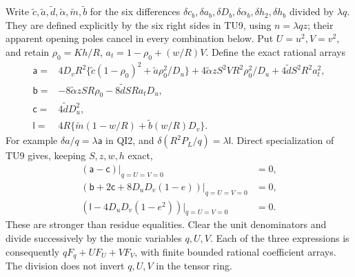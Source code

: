 Write $\widetilde c,\widetilde a,\widetilde d,\widetilde\alpha,
\widetilde m,\widetilde b$ for the six differences
$\delta c_b,\delta a_b,\delta D_b,\delta\alpha_b,
\delta h_2,\delta h_b$ divided by $\lambda q$.
They are defined explicitly by the six right sides in TU9, using
$n=\lambda qz$; their apparent opening poles cancel in every
combination below. Put $U=u^2,V=v^2$, and retain
$\rho_0=Kh/R$, $a_t=1-\rho_0+(w/R)V$.
Define the exact rational arrays
\[
\begin{split}
\mathsf a={}&4D_vR^2\{\widetilde c(1-\rho_0)^2
                      +\widetilde a\rho_0^2/D_u\}
 +4\widetilde\alpha zS^2VR^2\rho_0^2/D_u
 +4\widetilde d S^2R^2a_t^2,\\
\mathsf b={}&-8\widetilde\alpha zSR\rho_0
                         -8\widetilde d SRa_tD_u,\\
\mathsf c={}&4\widetilde dD_u^2,\\
\mathsf l={}&4R\{\widetilde m(1-w/R)
                              +\widetilde b(w/R)D_v\}.
\end{split}                                                     \tag{UL6}
\]
For example $\delta a/q=\lambda\mathsf a$ in QI2,
and $\delta(R^2P_L/q)=\lambda\mathsf l$.
Direct specialization of TU9 gives, keeping $S,z,w,h$ exact,
\[
\begin{split}
 (\mathsf a-\mathsf c)|_{q=U=V=0}&=0,\\
 (\mathsf b+2\mathsf c+8D_uD_v(1-e))|_{q=U=V=0}&=0,\\
 (\mathsf l-4D_uD_v(1-e^2))|_{q=U=V=0}&=0.
\end{split}                                                     \tag{UL7}
\]
These are stronger than residue equalities. Clear the unit
denominators and divide successively by the monic variables
$q,U,V$. Each of the three expressions is consequently
$qF_q+UF_U+VF_V$, with finite bounded rational coefficient arrays.
The division does not invert $q,U,V$ in the tensor ring.

